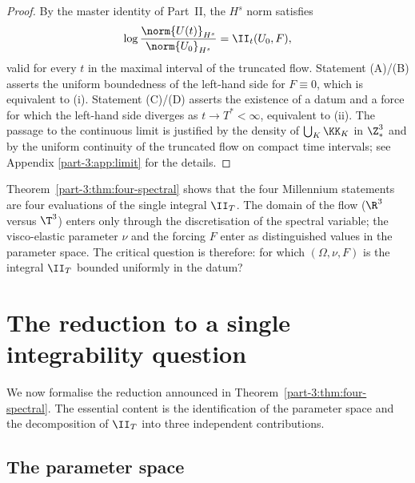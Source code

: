 \begin{proof}
By the master identity of Part~II, the $H^s$ norm satisfies
\begin{equation}\label{part-3:eq:log-Hs}
\log\frac{\norm{U(t)}_{H^s}}{\norm{U_0}_{H^s}} = \II_t(U_0,F),
\end{equation}
valid for every $t$ in the maximal interval of the truncated flow. 
Statement (A)/(B) asserts the uniform boundedness of the left-hand 
side for $F\equiv 0$, which is equivalent to (i). Statement (C)/(D) 
asserts the existence of a datum and a force for which the left-hand 
side diverges as $t\to T^\ast<\infty$, equivalent to (ii). The passage 
to the continuous limit is justified by the density of 
$\bigcup_{K}\KK_K$ in $\Z^3_\ast$ and by the uniform continuity of 
the truncated flow on compact time intervals; see Appendix 
\ref{part-3:app:limit} for the details.
\end{proof}

\begin{remark}\label{part-3:rem:single-question}
Theorem~\ref{part-3:thm:four-spectral} shows that the four Millennium 
statements are four evaluations of the single integral 
$\II_T$. The domain of the flow ($\R^3$ versus $\T^3$) enters only 
through the discretisation of the spectral variable; the 
visco-elastic parameter $\nu$ and the forcing $F$ enter as 
distinguished values in the parameter space. The critical question 
is therefore: for which $(\Omega,\nu,F)$ is the integral $\II_T$ 
bounded uniformly in the datum?
\end{remark}

\section{The reduction to a single integrability question}
\label{part-3:sec:reduction}

We now formalise the reduction announced in Theorem~\ref{part-3:thm:four-spectral}. 
The essential content is the identification of the parameter space and 
the decomposition of $\II_T$ into three independent contributions.

\subsection{The parameter space}
\label{part-3:ssec:parameter}

